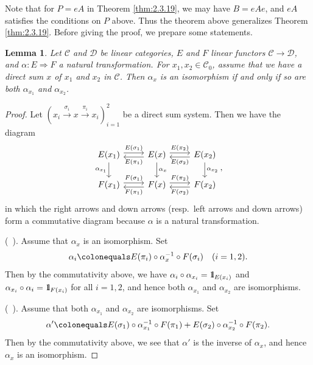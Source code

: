 \documentclass{surv-l}
\numberwithin{equation}{chapter}
\numberwithin{figure}{chapter}
\theoremstyle{plain}
\newtheorem{lem}[thm]{Lemma}
\theoremstyle{definition}
\theoremstyle{remark}
\newcommand{\id}{1\kern-.25em{\text{{\rm l}}}}
\newcommand{\Ar}[3]{\ar[from={#1}, to={#2}, #3]}
\begin{document}
Note that for $P = eA$ in Theorem \ref{thm:2.3.19}, we may have $B = eAe$, and
$eA$ satisfies the conditions on $P$ above.
Thus the theorem above generalizes Theorem \ref{thm:2.3.19}.
Before giving the proof, we prepare some statements.

\begin{lem}
\label{lem:nat-iso-ds}
Let ${\mathcal{C}}$ and ${\mathcal{D}}$ be linear categories, $E$ and $F$ linear functors ${\mathcal{C}} \to {\mathcal{D}}$, and $\alpha \colon E \Rightarrow F$
a natural transformation.
For $x_1, x_2 \in {\mathcal{C}}_0$, assume that we have a direct sum $x$ of $x_1$ and $x_2$ in ${\mathcal{C}}$.
Then $\alpha_x$ is an isomorphism
if and only if so are both $\alpha_{x_1}$ and $\alpha_{x_2}$.
\end{lem}


\begin{proof}
Let $(x_i \xrightarrow{\sigma_i} x \xrightarrow{\pi_i} x_i)_{i=1}^2$ be a direct sum system.
Then we have the diagram
\begin{equation}
\begin{tikzcd}
E(x_1) & E(x) & E(x_2)\\
F(x_1) & F(x) & F(x_2)
\Ar{1-1}{1-2}{"E(\sigma_1)", shift left}
\Ar{1-2}{1-1}{"E(\pi_1)", shift left}
\Ar{1-2}{1-3}{"E(\pi_2)", shift left}
\Ar{1-3}{1-2}{"E(\sigma_2)", shift left}
\Ar{2-1}{2-2}{"F(\sigma_1)", shift left}
\Ar{2-2}{2-1}{"F(\pi_1)", shift left}
\Ar{2-2}{2-3}{"F(\pi_2)", shift left}
\Ar{2-3}{2-2}{"F(\sigma_2)", shift left}
\Ar{1-1}{2-1}{"\alpha_{x_1}"'}
\Ar{1-2}{2-2}{"\alpha_{x}"}
\Ar{1-3}{2-3}{"\alpha_{x_2}"}
\end{tikzcd},
\end{equation}
in which the right arrows and down arrows (resp.\ left arrows and down arrows) form a commutative diagram
because $\alpha$ is a natural transformation.

(\text{$\Rightarrow$}\ ).
Assume that $\alpha_x$ is an isomorphism.
Set
\[
\alpha_i\colonequals  E(\pi_i)\circ \alpha_x^{-1} \circ F(\sigma_i)\quad(i = 1,2).
\]
Then by the commutativity above, we have
$\alpha_i\circ \alpha_{x_i} = \id_{E(x_i)}$ and $\alpha_{x_i} \circ \alpha_i = \id_{F(x_i)}$ for all $i = 1,2$,
and hence both $\alpha_{x_1}$ and $\alpha_{x_2}$ are isomorphisms.

(\text{$\Leftarrow$}\ ).
Assume that both $\alpha_{x_1}$ and $\alpha_{x_2}$ are isomorphisms.
Set
\[
\alpha'\colonequals  E(\sigma_1) \circ \alpha_{x_1}^{-1} \circ F(\pi_1) + E(\sigma_2) \circ \alpha_{x_2}^{-1} \circ F(\pi_2).
\]
Then by the commutativity above, we see that $\alpha'$ is the inverse of $\alpha_x$,
and hence $\alpha_x$ is an isomorphism.
\end{proof}
\end{document}
